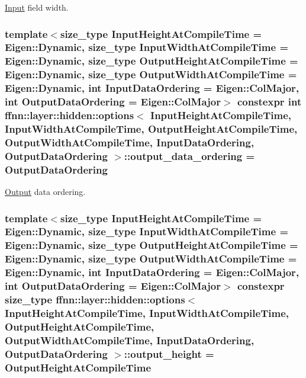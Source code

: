 \hyperlink{classffnn_1_1layer_1_1_input}{Input} field width. 

\hypertarget{structffnn_1_1layer_1_1hidden_1_1options_aca708d2c3dd945b311c4a00bfeb1976c}{
\subsubsection[{output\-\_\-data\-\_\-ordering}]{\setlength{\rightskip}{0pt plus 5cm}template$<$size\-\_\-type Input\-Height\-At\-Compile\-Time = Eigen\-::\-Dynamic, size\-\_\-type Input\-Width\-At\-Compile\-Time = Eigen\-::\-Dynamic, size\-\_\-type Output\-Height\-At\-Compile\-Time = Eigen\-::\-Dynamic, size\-\_\-type Output\-Width\-At\-Compile\-Time = Eigen\-::\-Dynamic, int Input\-Data\-Ordering = Eigen\-::\-Col\-Major, int Output\-Data\-Ordering = Eigen\-::\-Col\-Major$>$ constexpr int {\bf ffnn\-::layer\-::hidden\-::options}$<$ Input\-Height\-At\-Compile\-Time, Input\-Width\-At\-Compile\-Time, Output\-Height\-At\-Compile\-Time, Output\-Width\-At\-Compile\-Time, Input\-Data\-Ordering, Output\-Data\-Ordering $>$\-::output\-\_\-data\-\_\-ordering = Output\-Data\-Ordering\hspace{0.3cm}{\ttfamily [static]}}}\label{structffnn_1_1layer_1_1hidden_1_1options_aca708d2c3dd945b311c4a00bfeb1976c}


\hyperlink{classffnn_1_1layer_1_1_output}{Output} data ordering. 

\hypertarget{structffnn_1_1layer_1_1hidden_1_1options_a331b0dddbc72d13f8b490bef82fe3b16}{
\subsubsection[{output\-\_\-height}]{\setlength{\rightskip}{0pt plus 5cm}template$<$size\-\_\-type Input\-Height\-At\-Compile\-Time = Eigen\-::\-Dynamic, size\-\_\-type Input\-Width\-At\-Compile\-Time = Eigen\-::\-Dynamic, size\-\_\-type Output\-Height\-At\-Compile\-Time = Eigen\-::\-Dynamic, size\-\_\-type Output\-Width\-At\-Compile\-Time = Eigen\-::\-Dynamic, int Input\-Data\-Ordering = Eigen\-::\-Col\-Major, int Output\-Data\-Ordering = Eigen\-::\-Col\-Major$>$ constexpr {\bf size\-\_\-type} {\bf ffnn\-::layer\-::hidden\-::options}$<$ Input\-Height\-At\-Compile\-Time, Input\-Width\-At\-Compile\-Time, Output\-Height\-At\-Compile\-Time, Output\-Width\-At\-Compile\-Time, Input\-Data\-Ordering, Output\-Data\-Ordering $>$\-::output\-\_\-height = Output\-Height\-At\-Compile\-Time\hspace{0.3cm}{\ttfamily [static]}}}\label{structffnn_1_1layer_1_1hidden_1_1options_a331b0dddbc72d13f8b490bef82fe3b16}


